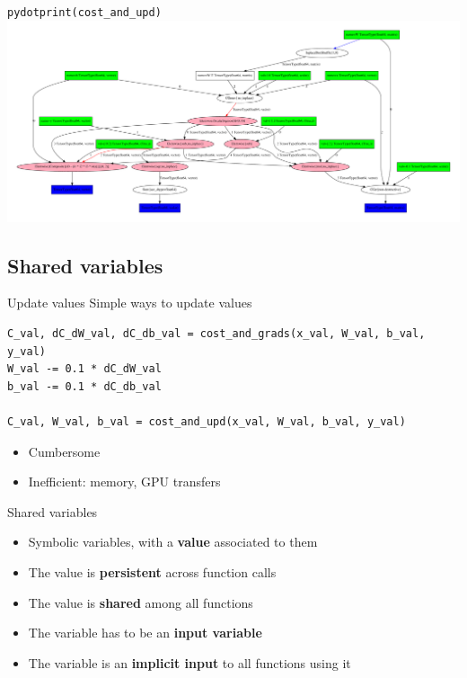 \documentclass[a4paper,9pt]{beamer}
\begin{document}
\begin{frame}{\tt pydotprint(cost\_and\_upd)}
  \includegraphics[width=\textwidth]{pydotprint_cost_and_upd.pdf}
\end{frame}

\subsection{Shared variables}
\begin{frame}[fragile]{Update values}
  Simple ways to update values
  \begin{verbatim}
C_val, dC_dW_val, dC_db_val = cost_and_grads(x_val, W_val, b_val, y_val)
W_val -= 0.1 * dC_dW_val
b_val -= 0.1 * dC_db_val

C_val, W_val, b_val = cost_and_upd(x_val, W_val, b_val, y_val)
  \end{verbatim}
  \begin{itemize}
    \item Cumbersome
    \item Inefficient: memory, GPU transfers
  \end{itemize}
\end{frame}

\begin{frame}{Shared variables}
  \begin{itemize}
    \item Symbolic variables, with a {\bf value} associated to them
    \item The value is {\bf persistent} across function calls
    \item The value is {\bf shared} among all functions
    \item The variable has to be an {\bf input variable}
    \item The variable is an {\bf implicit input} to all functions using it
  \end{itemize}
\end{frame}
\end{document}
